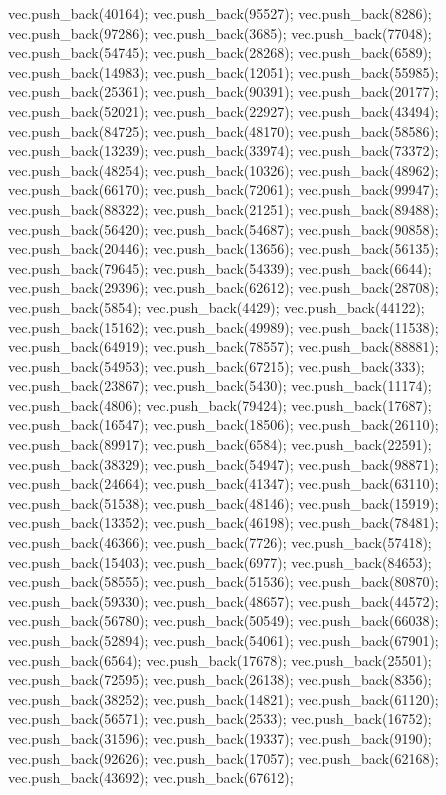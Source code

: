 vec.push_back(40164);
vec.push_back(95527);
vec.push_back(8286);
vec.push_back(97286);
vec.push_back(3685);
vec.push_back(77048);
vec.push_back(54745);
vec.push_back(28268);
vec.push_back(6589);
vec.push_back(14983);
vec.push_back(12051);
vec.push_back(55985);
vec.push_back(25361);
vec.push_back(90391);
vec.push_back(20177);
vec.push_back(52021);
vec.push_back(22927);
vec.push_back(43494);
vec.push_back(84725);
vec.push_back(48170);
vec.push_back(58586);
vec.push_back(13239);
vec.push_back(33974);
vec.push_back(73372);
vec.push_back(48254);
vec.push_back(10326);
vec.push_back(48962);
vec.push_back(66170);
vec.push_back(72061);
vec.push_back(99947);
vec.push_back(88322);
vec.push_back(21251);
vec.push_back(89488);
vec.push_back(56420);
vec.push_back(54687);
vec.push_back(90858);
vec.push_back(20446);
vec.push_back(13656);
vec.push_back(56135);
vec.push_back(79645);
vec.push_back(54339);
vec.push_back(6644);
vec.push_back(29396);
vec.push_back(62612);
vec.push_back(28708);
vec.push_back(5854);
vec.push_back(4429);
vec.push_back(44122);
vec.push_back(15162);
vec.push_back(49989);
vec.push_back(11538);
vec.push_back(64919);
vec.push_back(78557);
vec.push_back(88881);
vec.push_back(54953);
vec.push_back(67215);
vec.push_back(333);
vec.push_back(23867);
vec.push_back(5430);
vec.push_back(11174);
vec.push_back(4806);
vec.push_back(79424);
vec.push_back(17687);
vec.push_back(16547);
vec.push_back(18506);
vec.push_back(26110);
vec.push_back(89917);
vec.push_back(6584);
vec.push_back(22591);
vec.push_back(38329);
vec.push_back(54947);
vec.push_back(98871);
vec.push_back(24664);
vec.push_back(41347);
vec.push_back(63110);
vec.push_back(51538);
vec.push_back(48146);
vec.push_back(15919);
vec.push_back(13352);
vec.push_back(46198);
vec.push_back(78481);
vec.push_back(46366);
vec.push_back(7726);
vec.push_back(57418);
vec.push_back(15403);
vec.push_back(6977);
vec.push_back(84653);
vec.push_back(58555);
vec.push_back(51536);
vec.push_back(80870);
vec.push_back(59330);
vec.push_back(48657);
vec.push_back(44572);
vec.push_back(56780);
vec.push_back(50549);
vec.push_back(66038);
vec.push_back(52894);
vec.push_back(54061);
vec.push_back(67901);
vec.push_back(6564);
vec.push_back(17678);
vec.push_back(25501);
vec.push_back(72595);
vec.push_back(26138);
vec.push_back(8356);
vec.push_back(38252);
vec.push_back(14821);
vec.push_back(61120);
vec.push_back(56571);
vec.push_back(2533);
vec.push_back(16752);
vec.push_back(31596);
vec.push_back(19337);
vec.push_back(9190);
vec.push_back(92626);
vec.push_back(17057);
vec.push_back(62168);
vec.push_back(43692);
vec.push_back(67612);
